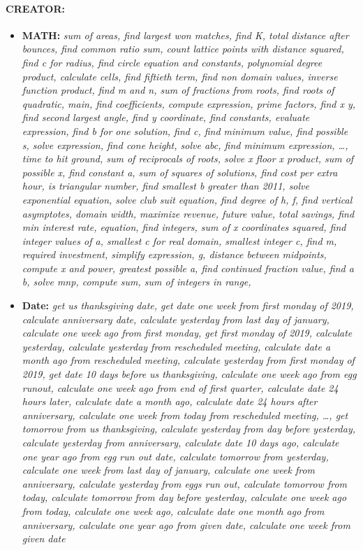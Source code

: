 \paragraph{CREATOR:}
\begin{itemize}[noitemsep, topsep=0pt]
    \item \textbf{MATH:}  \textit{sum of areas, find largest won matches, find K, total distance after bounces, find common ratio sum, count lattice points with distance squared, find c for radius, find circle equation and constants, polynomial degree product, calculate cells, find fiftieth term, find non domain values, inverse function product, find m and n, sum of fractions from roots, find roots of quadratic, main, find coefficients, compute expression, prime factors, find x y, find second largest angle, find y coordinate, find constants, evaluate expression, find b for one solution, find c, find minimum value, find possible s, solve expression, find cone height, solve abc, find minimum expression, \dots, time to hit ground, sum of reciprocals of roots, solve x floor x product, sum of possible x, find constant a, sum of squares of solutions, find cost per extra hour, is triangular number, find smallest b greater than 2011, solve exponential equation, solve club suit equation, find degree of h, f, find vertical asymptotes, domain width, maximize revenue, future value, total savings, find min interest rate, equation, find integers, sum of x coordinates squared, find integer values of a, smallest c for real domain, smallest integer c, find m, required investment, simplify expression, g, distance between midpoints, compute x and power, greatest possible a, find continued fraction value, find a b, solve mnp, compute sum, sum of integers in range,
    }

    \item \textbf{Date:}  \textit{get us thanksgiving date, get date one week from first monday of 2019, calculate anniversary date, calculate yesterday from last day of january, calculate one week ago from first monday, get first monday of 2019, calculate yesterday, calculate yesterday from rescheduled meeting, calculate date a month ago from rescheduled meeting, calculate yesterday from first monday of 2019, get date 10 days before us thanksgiving, calculate one week ago from egg runout, calculate one week ago from end of first quarter, calculate date 24 hours later, calculate date a month ago, calculate date 24 hours after anniversary, calculate one week from today from rescheduled meeting, \dots, get tomorrow from us thanksgiving, calculate yesterday from day before yesterday, calculate yesterday from anniversary, calculate date 10 days ago, calculate one year ago from egg run out date, calculate tomorrow from yesterday, calculate one week from last day of january, calculate one week from anniversary, calculate yesterday from eggs run out, calculate tomorrow from today, calculate tomorrow from day before yesterday, calculate one week ago from today, calculate one week ago, calculate date one month ago from anniversary, calculate one year ago from given date, calculate one week from given date}


\end{itemize}
